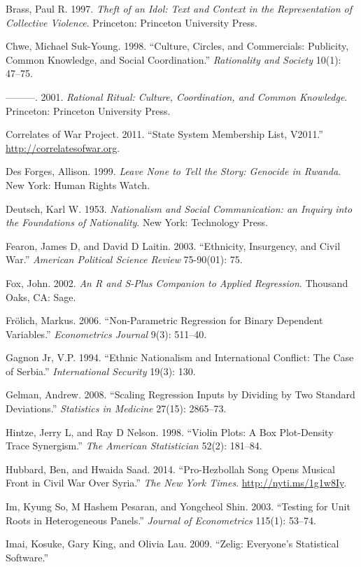\documentclass[11pt,article,oneside]{memoir}
\begin{document}
Brass, Paul R. 1997. \emph{Theft of an Idol: Text and Context in the
Representation of Collective Violence}. Princeton: Princeton University
Press.

Chwe, Michael Suk-Young. 1998. ``Culture, Circles, and Commercials:
Publicity, Common Knowledge, and Social Coordination.''
\emph{Rationality and Society} 10(1): 47--75.

---------. 2001. \emph{Rational Ritual: Culture, Coordination, and
Common Knowledge}. Princeton: Princeton University Press.

Correlates of War Project. 2011. ``State System Membership List,
V2011.'' \url{http://correlatesofwar.org}.

Des Forges, Allison. 1999. \emph{Leave None to Tell the Story: Genocide
in Rwanda}. New York: Human Rights Watch.

Deutsch, Karl W. 1953. \emph{Nationalism and Social Communication: an
Inquiry into the Foundations of Nationality}. New York: Technology
Press.

Fearon, James D, and David D Laitin. 2003. ``Ethnicity, Insurgency, and
Civil War.'' \emph{American Political Science Review} 75-90(01): 75.

Fox, John. 2002. \emph{An R and S-Plus Companion to Applied Regression}.
Thousand Oaks, CA: Sage.

Fr{ö}lich, Markus. 2006. ``Non-Parametric Regression for Binary
Dependent Variables.'' \emph{Econometrics Journal} 9(3): 511--40.

Gagnon Jr, V.P. 1994. ``Ethnic Nationalism and International Conflict:
The Case of Serbia.'' \emph{International Security} 19(3): 130.

Gelman, Andrew. 2008. ``Scaling Regression Inputs by Dividing by Two
Standard Deviations.'' \emph{Statistics in Medicine} 27(15): 2865--73.

Hintze, Jerry L, and Ray D Nelson. 1998. ``Violin Plots: A Box
Plot-Density Trace Synergism.'' \emph{The American Statistician} 52(2):
181--84.

Hubbard, Ben, and Hwaida Saad. 2014. ``Pro-Hezbollah Song Opens Musical
Front in Civil War Over Syria.'' \emph{The New York Times}.
\url{http://nyti.ms/1g1w8Iy}.

Im, Kyung So, M Hashem Pesaran, and Yongcheol Shin. 2003. ``Testing for
Unit Roots in Heterogeneous Panels.'' \emph{Journal of Econometrics}
115(1): 53--74.

Imai, Kosuke, Gary King, and Olivia Lau. 2009. ``Zelig: Everyone's
Statistical Software.''
\end{document}
